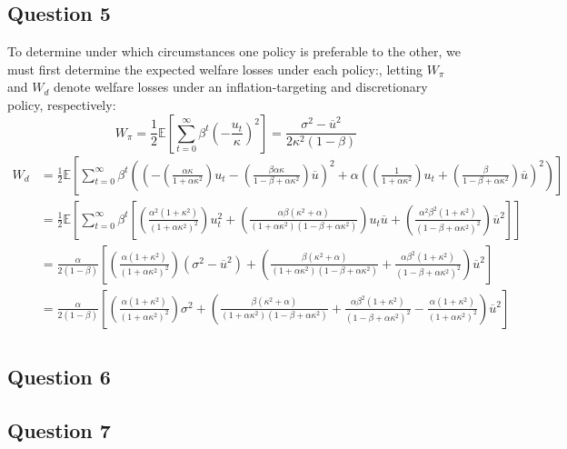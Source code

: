 \documentclass{article}
\newcommand{\E}[1]{\mathbb{E}\left[#1\right]} %
\begin{document}

\subsection*{Question 5}
To determine under which circumstances one policy is preferable to the other, we must first determine the expected welfare losses under each policy:, letting $W_\pi$ and $W_d$ denote welfare losses under an inflation-targeting and discretionary policy, respectively:
\[
	W_\pi 	= \frac{1}{2}\E{\sum_{t=0}^\infty\beta^t\left(-\frac{u_t}{\kappa}\right)^2}
			= \frac{\sigma^2-\overline{u}^2}{2\kappa^2(1-\beta)}
\]
{\footnotesize \begin{align*}
	W_d		&= \frac{1}{2}\E{\sum_{t=0}^\infty\beta^t\left(\left(-\left(\frac{\alpha\kappa}{1 + \alpha\kappa^2}\right)u_t - \left(\frac{\beta\alpha\kappa}{1 -\beta + \alpha\kappa^2}\right)\overline{u}\right)^2 + \alpha\left(\left(\frac{1}{1 + \alpha\kappa^2}\right)u_t + \left(\frac{\beta}{1 -\beta + \alpha\kappa^2}\right)\overline{u}\right)^2\right)}	\\
		&= \frac{1}{2}\E{\sum_{t=0}^\infty\beta^t\left[
				\left(\frac{\alpha^2(1+\kappa^2)}{(1+\alpha\kappa^2)^2}\right)u_t^2 + 
				\left(\frac{\alpha\beta(\kappa^2 + \alpha)}{(1+\alpha\kappa^2)(1-\beta+\alpha\kappa^2)}\right)u_t\overline{u} + 
				\left(\frac{\alpha^2\beta^2(1+\kappa^2)}{(1-\beta+\alpha\kappa^2)^2}\right)\overline{u}^2
			\right]}		\\
		&= \frac{\alpha}{2(1-\beta)}\left[
				\left(\frac{\alpha(1+\kappa^2)}{(1+\alpha\kappa^2)^2}\right)(\sigma^2-\overline{u}^2) + 
				\left(\frac{\beta(\kappa^2 + \alpha)}{(1+\alpha\kappa^2)(1-\beta+\alpha\kappa^2)} + \frac{\alpha\beta^2(1+\kappa^2)}{(1-\beta+\alpha\kappa^2)^2}\right)\overline{u}^2
			\right]		\\
		&= \frac{\alpha}{2(1-\beta)}\left[
				\left(\frac{\alpha(1+\kappa^2)}{(1+\alpha\kappa^2)^2}\right)\sigma^2 + 
				\left(\frac{\beta(\kappa^2 + \alpha)}{(1+\alpha\kappa^2)(1-\beta+\alpha\kappa^2)} + \frac{\alpha\beta^2(1+\kappa^2)}{(1-\beta+\alpha\kappa^2)^2}-\frac{\alpha(1+\kappa^2)}{(1+\alpha\kappa^2)^2}\right)\overline{u}^2
			\right]		\\
\end{align*} }




\subsection*{Question 6}





\subsection*{Question 7}




\end{document}
